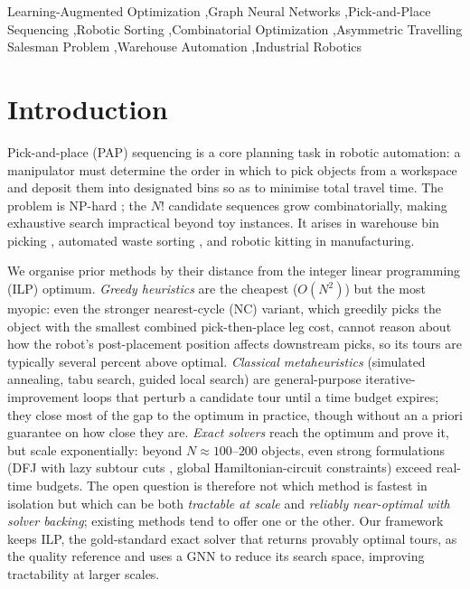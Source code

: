 \documentclass[review,times]{elsarticle}
\begin{document}
\begin{frontmatter}
\begin{keyword}
Learning-Augmented Optimization \sep Graph Neural Networks \sep Pick-and-Place Sequencing \sep Robotic Sorting \sep Combinatorial Optimization \sep Asymmetric Travelling Salesman Problem \sep Warehouse Automation \sep Industrial Robotics
\end{keyword}

\end{frontmatter}

\section{Introduction}

Pick-and-place (PAP) sequencing is a core planning task in robotic automation: a manipulator must determine the order in which to pick objects from a workspace and deposit them into designated bins so as to minimise total travel time. The problem is NP-hard \cite{chalasani1996}; the $N!$ candidate sequences grow combinatorially, making exhaustive search impractical beyond toy instances. It arises in warehouse bin picking \cite{cheng2024drl}, automated waste sorting \cite{gundupalli2021sequence, kiyokawa2024challenges}, and robotic kitting in manufacturing.

We organise prior methods by their distance from the integer linear programming (ILP) optimum. \emph{Greedy heuristics} are the cheapest ($O(N^2)$) but the most myopic: even the stronger nearest-cycle (NC) variant, which greedily picks the object with the smallest combined pick-then-place leg cost, cannot reason about how the robot's post-placement position affects downstream picks, so its tours are typically several percent above optimal. \emph{Classical metaheuristics} (simulated annealing, tabu search, guided local search) are general-purpose iterative-improvement loops that perturb a candidate tour until a time budget expires; they close most of the gap to the optimum in practice, though without an a priori guarantee on how close they are. \emph{Exact solvers} reach the optimum and prove it, but scale exponentially: beyond $N\!\approx\!100\text{--}200$ objects, even strong formulations (DFJ with lazy subtour cuts \cite{dantzig1954}, global Hamiltonian-circuit constraints) exceed real-time budgets. The open question is therefore not which method is fastest in isolation but which can be both \emph{tractable at scale} and \emph{reliably near-optimal with solver backing}; existing methods tend to offer one or the other. Our framework keeps ILP, the gold-standard exact solver that returns provably optimal tours, as the quality reference and uses a GNN to reduce its search space, improving tractability at larger scales.
\end{document}
